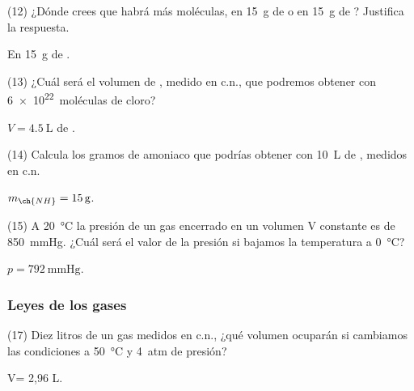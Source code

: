 \documentclass[10pt]{article}
\begin{document}
\begin{multicols}{2}
\begin{exercise}
  (12) ¿Dónde crees que habrá más moléculas, en \SI{15}{g} de  o en
  \SI{15}{g} de ? Justifica la respuesta.
\end{exercise}
\begin{solution}
  En \SI{15}{g} de .
\end{solution}

\begin{exercise}
  (13) ¿Cuál será el volumen de , medido en c.n., que podremos
  obtener con \SI{6e22}{moléculas} de cloro?
\end{exercise}
\begin{solution}
  \( V = \SI{4.5}{\liter} \) de .
\end{solution}

\begin{exercise}
  (14) Calcula los gramos de amoniaco que podrías obtener con \SI{10}{\liter}
  de , medidos en c.n.
\end{exercise}
\begin{solution}
  \( m_{\ch{NH}} = \SI{15}{g} \).
\end{solution}

\begin{exercise}
  (15) A \SI{20}{\celsius} la presión de un gas encerrado en un volumen V constante es de \SI{850}{\mmHg}. ¿Cuál será el valor de la presión si bajamos la temperatura a \SI{0}{\celsius}?
\end{exercise}
\begin{solution}
  \( p = \SI{792}{\mmHg} \).
\end{solution}



\subsubsection{Leyes de los gases}

\begin{exercise}
  (17) Diez litros de un gas medidos en c.n., ¿qué volumen ocuparán
  si cambiamos las condiciones a \SI{50}{\celsius} y \SI{4}{atm} de presión?
\end{exercise}
\begin{solution}
  V= 2,96 L.
\end{solution}


\end{multicols}
\end{document}

